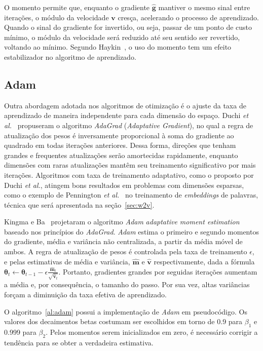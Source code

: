 O momento permite que, enquanto o gradiente $\mathbf{\hat{g}}$ mantiver o mesmo sinal entre iterações, o módulo da velocidade $\mathbf{v}$ cresça, acelerando o processo de aprendizado. Quando o sinal do gradiente for invertido, ou seja, passar de um ponto de custo mínimo, o módulo da velocidade será reduzido até seu sentido ser revertido, voltando ao mínimo. Segundo Haykin~\cite{haykin09}, o uso do momento tem um efeito estabilizador no algoritmo de aprendizado.

\subsection{Adam}

Outra abordagem adotada nos algoritmos de otimização é o ajuste da taxa de aprendizado de maneira independente para cada dimensão do espaço. Duchi \textit{et al.}~\cite{duchi11} propuseram o algoritmo \textit{AdaGrad} (\textit{Adaptative Gradient}), no qual a regra de atualização dos pesos é inversamente proporcional à soma do gradiente ao quadrado em todas iterações anteriores. Dessa forma, direções que tenham grandes e frequentes atualizações serão amortecidas rapidamente, enquanto dimensões com raras atualizações mantêm seu treinamento significativo por mais iterações. Algoritmos com taxa de treinamento adaptativo, como o proposto por Duchi \textit{et al.}, atingem bons resultados em problemas com dimensões esparsas, como o exemplo de Pennington \textit{et al.}~\cite{pennington14} no treinamento de \textit{embeddings} de palavras, técnica que será apresentada na seção~\ref{sec:w2v}.

Kingma e Ba~\cite{kingma14} projetaram o algoritmo \textit{Adam} \textit{adaptative moment estimation} baseado nos princípios do \textit{AdaGrad}. \textit{Adam} estima o primeiro e segundo momentos do gradiente, média e variância não centralizada, a partir da média móvel de ambos. A regra de atualização de pesos é controlada pela taxa de treinamento $\epsilon$, e pelas estimativas de média e variância, $\mathbf{\hat{m}}$ e $\mathbf{\hat{v}}$ respectivamente, dada a fórmula $\boldsymbol{\theta}_{t} \gets \boldsymbol{\theta}_{t-1} - \epsilon \frac{\mathbf{\hat{m}}_{t}}{\sqrt{\mathbf{\hat{v}}_{t}}} $. Portanto, gradientes grandes por seguidas iterações aumentam a média e, por consequência, o tamanho do passo. Por sua vez, altas variâncias forçam a diminuição da taxa efetiva de aprendizado.

O algoritmo~\ref{al:adam} possui a implementação de \textit{Adam} em pseudocódigo. Os valores dos decaimentos betas costumam ser escolhidos em torno de 0.9 para $\beta_{1}$ e 0.999 para $\beta_{2}$. Pelos momentos serem inicializados em zero, é necessário corrigir a tendência para se obter a verdadeira estimativa.

